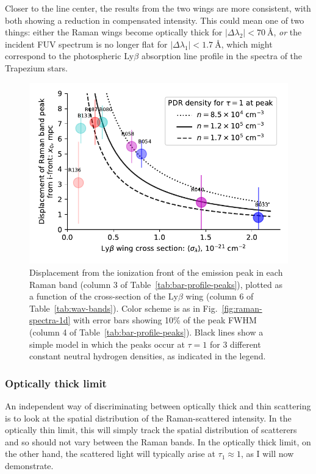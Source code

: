 \documentclass[useAMS, usenatbib, a4paper]{mnras}
\newcommand\lyb{\ensuremath{\text{Ly}\beta}}
\begin{document}
Closer to the line center, the results from the two wings are more consistent,
with both showing a reduction in compensated intensity.
This could mean one of two things: either the Raman wings become optically thick
for \(\vert \Delta\lambda_2 \vert < \SI{70}{\angstrom}\),
\emph{or} the incident FUV spectrum is no longer flat for \(\vert \Delta\lambda_1 \vert < \SI{1.7}{\angstrom}\),
which might correspond to the photospheric \lyb{} absorption line profile
in the spectra of the Trapezium stars.

\begin{figure}
  \includegraphics[width=\linewidth]{figs/raman-band-displacements-plot}
  \caption{Displacement from the ionization front of the emission peak
    in each Raman band (column 3 of
    Table~\ref{tab:bar-profile-peaks}), plotted as a function of the
    cross-section of the \lyb{} wing (column 6 of
    Table~\ref{tab:wav-bands}).  Color scheme is as in
    Fig.~\ref{fig:raman-spectra-1d} with error bars showing 10\% of
    the peak FWHM (column 4 of Table~\ref{tab:bar-profile-peaks}).
    Black lines show a simple model in which the peaks occur at
    \(\tau = 1\) for 3 different constant neutral hydrogen densities, as
    indicated in the legend. }
  \label{fig:raman-band-displacements}
\end{figure}


\subsubsection{Optically thick limit}
\label{sec:optic-thick-limit}

An independent way of discriminating between optically thick and thin scattering
is to look at the spatial distribution of the Raman-scattered intensity.
In the optically thin limit, this will simply track the spatial distribution of scatterers
and so should not vary between the Raman bands.
In the optically thick limit, on the other hand, the scattered light will typically
arise at \(\tau_1 \approx 1\), as I will now demonstrate.
\end{document}
